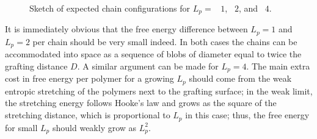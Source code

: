 \begin{figure}
	\begin{center}


	\end{center}
	\caption[Sketch of expected chain configurations for $L_p = 1, 2,$ and $4$]{Sketch of expected chain configurations for $L_p =$ ~$1$, ~$2$, and ~$4$.}\label{geom}
\end{figure}

It is immediately obvious that the free energy difference between $L_p=1$ and $L_p=2$ per chain should 
be very small indeed. In both cases the chains can be accommodated into space as a sequence 
of blobs of diameter equal to twice the grafting distance $D$.  A similar argument can be made for $L_p=4$. 
The main extra cost in free energy per polymer for a growing $L_p$ should come from the weak entropic stretching of the polymers next to the grafting surface; in the weak limit, the stretching energy follows Hooke's law and grows as the square of the stretching distance, which is proportional to $L_p$ in this case; thus, the free energy for small $L_p$ should weakly grow as $L_p^2$.


